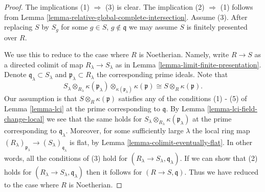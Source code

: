 \begin{proof}
The implications (1) $\Rightarrow$ (3) is clear.
The implication (2) $\Rightarrow$ (1) follows from
Lemma \ref{lemma-relative-global-complete-intersection}.
Assume (3). After replacing $S$ by $S_g$ for some
$g \in S$, $g\not\in \mathfrak q$ we may assume $S$
is finitely presented over $R$.

\medskip\noindent
We use this to reduce to the case where $R$ is Noetherian.
Namely, write $R \to S$ as a directed colimit
of map $R_\lambda \to S_\lambda$ as in
Lemma \ref{lemma-limit-finite-presentation}.
Denote $\mathfrak q_\lambda \subset S_\lambda$ and
$\mathfrak p_\lambda \subset R_\lambda$ the corresponding
prime ideals. Note that
$$
S_\lambda \otimes_{R_\lambda} \kappa(\mathfrak p_\lambda)
\otimes_{\kappa(\mathfrak p_\lambda)} \kappa(\mathfrak p)
\cong
S\otimes_R \kappa(\mathfrak p).
$$
Our assumption is that $S \otimes_R \kappa(\mathfrak p)$
satisfies any of the conditions (1) - (5) of
Lemma \ref{lemma-lci} at the prime corresponding to
$\mathfrak q$. By Lemma \ref{lemma-lci-field-change-local}
we see that the same holds for
$S_\lambda \otimes_{R_\lambda} \kappa(\mathfrak p_\lambda)$
at the prime corresponding to $\mathfrak q_\lambda$.
Moreover, for some sufficiently large $\lambda$
the local ring map $(R_\lambda)_{\mathfrak p_\lambda}
\to (S_\lambda)_{\mathfrak q_\lambda}$ is flat,
by Lemma \ref{lemma-colimit-eventually-flat}.
In other words, all the conditions of (3) hold
for $(R_\lambda \to S_\lambda, \mathfrak q_\lambda)$.
If we can show that (2) holds for
$(R_\lambda \to S_\lambda, \mathfrak q_\lambda)$
then it follows for $(R \to S, \mathfrak q)$.
Thus we have reduced to the case where $R$ is Noetherian.


\end{proof}
